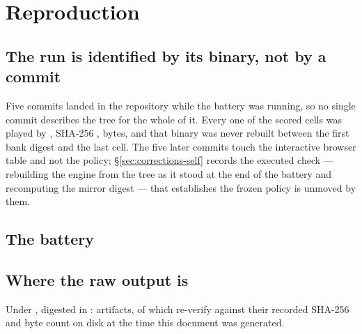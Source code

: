 \section{Reproduction}
\label{app:repro}

\subsection*{The run is identified by its binary, not by a commit}

Five commits landed in the repository while the battery was running, so no single commit describes the
tree for the whole of it. Every one of the \vsevenScoredCells{} scored cells was played by
, SHA-256 \texttt{\vsevenBinarySha{}}, \vsevenBinaryBytes{} bytes, and that
binary was never rebuilt between the first bank digest and the last cell. The five later commits touch
the interactive browser table and not the policy; \S\ref{sec:corrections-self} records the executed
check --- rebuilding the engine from the tree as it stood at the end of the battery and recomputing the
mirror digest --- that establishes the frozen policy is unmoved by them.

\subsection*{The battery}

\begin{table}[h]\centering
\caption{Every preregistered battery against what was measured. \emph{Preregistered} is the count the
protocol names, not the count that ran: deviations D1 and D2 add a B5 reference cell and sixteen B9
cells, because without them ``no single leave-one-out drop exceeds the whole, ``the recovered size
tracks the planted size and ``the planted excess resolves to zero are not computable from the
cells the protocol lists. No cell was dropped.}
\label{tab:battery}

\end{table}

\subsection*{Where the raw output is}

Under , digested in
: \vsevenManifestRuns{} artifacts, of which
\vsevenManifestVerified{} re-verify against their recorded SHA-256 and byte count on disk at the time
this document was generated.

